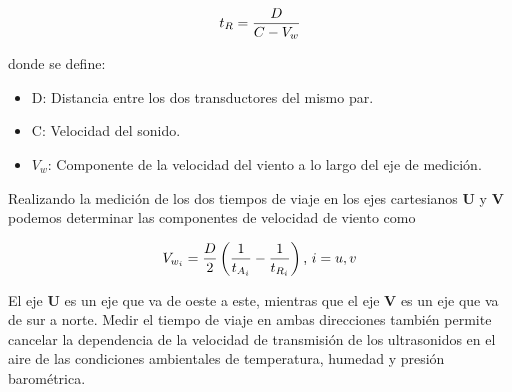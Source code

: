 \begin{equation}
  \centering
  t_{R} = \frac{D}{C - V_{w}}
  \label{eq:t_R}
\end{equation}

donde se define:
\begin{itemize}
  \item D: Distancia entre los dos transductores del mismo par.
  \item C: Velocidad del sonido.
  \item $V_{w}$: Componente de la velocidad del viento a lo largo del eje de medición.
\end{itemize}

Realizando la medición de los dos tiempos de viaje en los ejes cartesianos $\mathbf{U}$ y $\mathbf{V}$ podemos determinar las componentes de velocidad de viento como 


\begin{equation}
  \centering
  V_{w_{i}} = \frac{D}{2}\left(\frac{1}{t_{A_{i}}}-\frac{1}{t_{R_{i}}}\right)\text{,  } i= u,v
  \label{eq:velViento}
\end{equation}

El eje $\mathbf{U}$ es un eje que va de oeste a este, mientras que el eje $\mathbf{V}$ es un eje que va de sur a norte. Medir el tiempo de viaje en ambas direcciones también permite cancelar la dependencia de la velocidad de transmisión de los ultrasonidos en el aire de las condiciones ambientales de temperatura, humedad y presión barométrica.



